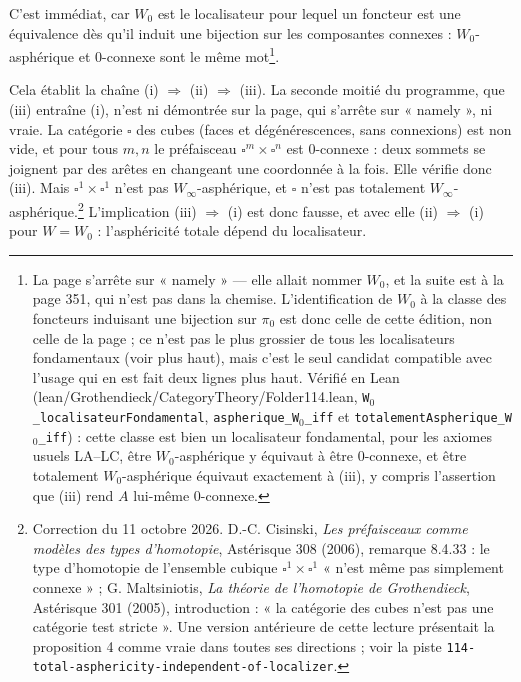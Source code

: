 \documentclass[11pt,a4paper]{article}
\begin{document}
C'est immédiat, car $W_{0}$ est le localisateur pour lequel un foncteur est une
équivalence dès qu'il induit une bijection sur les composantes connexes :
$W_{0}$-asphérique et $0$-connexe sont le même mot\footnote{La page s'arrête sur
« namely » — elle allait nommer $W_{0}$, et la suite est à la page 351, qui n'est
pas dans la chemise. L'identification de $W_{0}$ à la classe des foncteurs
induisant une bijection sur $\pi_{0}$ est donc celle de cette édition, non celle
de la page ; ce n'est pas le plus grossier de tous les localisateurs fondamentaux (voir plus haut), mais c'est le seul candidat
compatible avec l'usage qui en est fait deux lignes plus haut. Vérifié en
Lean (lean/Grothendieck/CategoryTheory/Folder114.lean, \texttt{W}$_{0}$\texttt{\_localisateurFondamental},
\texttt{aspherique\_W}$_{0}$\texttt{\_iff} et \texttt{totalementAspherique\_W}$_{0}$\texttt{\_iff}) :
cette classe est bien un localisateur fondamental, pour les axiomes usuels
LA--LC, être $W_{0}$-asphérique y équivaut à être $0$-connexe, et être
totalement $W_{0}$-asphérique équivaut exactement à (iii), y compris
l'assertion que (iii) rend $A$ lui-même $0$-connexe.}.

Cela établit la chaîne (i) $\Rightarrow$ (ii) $\Rightarrow$ (iii). La seconde
moitié du programme, que (iii) entraîne (i), n'est ni démontrée sur la page, qui
s'arrête sur « namely », ni vraie. La catégorie $\square$ des cubes (faces et
dégénérescences, sans connexions) est non vide, et pour tous $m, n$ le
préfaisceau $\square^{m} \times \square^{n}$ est $0$-connexe : deux sommets
se joignent par des arêtes en changeant une coordonnée à la fois. Elle vérifie
donc (iii). Mais $\square^{1} \times \square^{1}$ n'est pas
$W_{\infty}$-asphérique, et $\square$ n'est pas totalement
$W_{\infty}$-asphérique.\footnote{Correction du 11 octobre 2026. D.-C. Cisinski,
\emph{Les préfaisceaux comme modèles des types d'homotopie}, Astérisque 308
(2006), remarque 8.4.33 : le type d'homotopie de l'ensemble cubique
$\square^{1} \times \square^{1}$ « n'est même pas simplement connexe » ;
G. Maltsiniotis, \emph{La théorie de l'homotopie de Grothendieck}, Astérisque
301 (2005), introduction : « la catégorie des cubes n'est pas une catégorie test
stricte ». Une version antérieure de cette lecture présentait la proposition 4
comme vraie dans toutes ses directions ; voir la piste
\texttt{114-total-asphericity-independent-of-localizer}.} L'implication
(iii) $\Rightarrow$ (i) est donc fausse, et avec elle (ii) $\Rightarrow$ (i)
pour $W = W_{0}$ : l'asphéricité totale dépend du localisateur.
\end{document}
